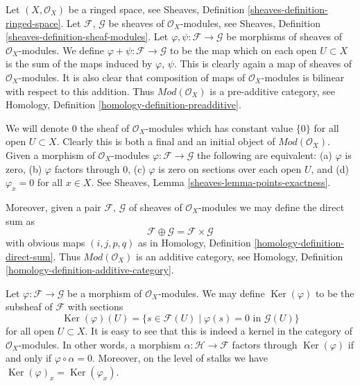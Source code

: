 \documentclass{stacks-project}
\theoremstyle{plain}
\theoremstyle{definition}
\theoremstyle{remark}
\numberwithin{equation}{subsection}
\def\Ker{\mathop{\mathrm{Ker}}}
\begin{document}
\noindent
Let $(X, \mathcal{O}_X)$ be a ringed space, see
Sheaves, Definition \ref{sheaves-definition-ringed-space}.
Let $\mathcal{F}$, $\mathcal{G}$ be sheaves of $\mathcal{O}_X$-modules, see
Sheaves, Definition \ref{sheaves-definition-sheaf-modules}.
Let $\varphi, \psi : \mathcal{F} \to \mathcal{G}$
be morphisms of sheaves of $\mathcal{O}_X$-modules.
We define $\varphi + \psi : \mathcal{F} \to \mathcal{G}$
to be the map which on each open $U \subset X$ is the
sum of the maps induced by $\varphi$, $\psi$. This is
clearly again a map of sheaves of $\mathcal{O}_X$-modules.
It is also clear that composition of maps of
$\mathcal{O}_X$-modules is bilinear with respect to this
addition. Thus $\textit{Mod}(\mathcal{O}_X)$ is a pre-additive
category, see Homology, Definition \ref{homology-definition-preadditive}.

\medskip\noindent
We will denote $0$ the sheaf of $\mathcal{O}_X$-modules
which has constant value $\{0\}$ for all open $U \subset X$.
Clearly this is both a final and an initial object of
$\textit{Mod}(\mathcal{O}_X)$. Given a morphism
of $\mathcal{O}_X$-modules $\varphi : \mathcal{F} \to \mathcal{G}$
the following are equivalent:
(a) $\varphi$ is zero, (b) $\varphi$ factors through $0$,
(c) $\varphi$ is zero on sections over each open $U$, and
(d) $\varphi_x = 0$ for all $x \in X$. See
Sheaves, Lemma \ref{sheaves-lemma-points-exactness}.

\medskip\noindent
Moreover, given a pair
$\mathcal{F}$, $\mathcal{G}$ of sheaves of $\mathcal{O}_X$-modules
we may define the direct sum as
$$
\mathcal{F} \oplus \mathcal{G} = \mathcal{F} \times \mathcal{G}
$$
with obvious maps $(i, j, p, q)$ as in Homology, Definition
\ref{homology-definition-direct-sum}. Thus $\textit{Mod}(\mathcal{O}_X)$
is an additive category, see
Homology, Definition \ref{homology-definition-additive-category}.

\medskip\noindent
Let $\varphi : \mathcal{F} \to \mathcal{G}$ be a morphism
of $\mathcal{O}_X$-modules. We may define $\Ker(\varphi)$
to be the subsheaf of $\mathcal{F}$ with sections
$$
\Ker(\varphi)(U) =
\{ s \in \mathcal{F}(U) \mid \varphi(s) = 0 \text{ in } \mathcal{G}(U)\}
$$
for all open $U \subset X$. It is easy to see that this is indeed
a kernel in the category of $\mathcal{O}_X$-modules. In other words,
a morphism $\alpha : \mathcal{H} \to \mathcal{F}$ factors
through $\Ker(\varphi)$ if and only if $\varphi \circ \alpha = 0$.
Moreover, on the level of stalks we have
$\Ker(\varphi)_x = \Ker(\varphi_x)$.
\end{document}
